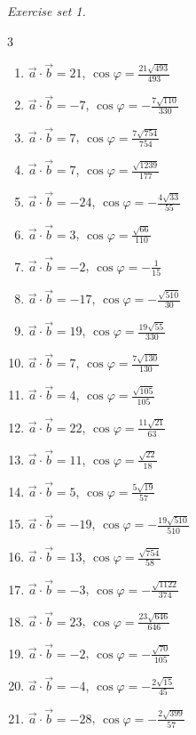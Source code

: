 \par\noindent\emph{Exercise set 1.}\nopagebreak
\begin{multicols}{3}\raggedright
\begin{enumerate}[label=\arabic*., leftmargin=*, itemsep=1pt]
\item $\vec a\cdot\vec b=21$, $\cos\varphi=\frac{21 \sqrt{493}}{493}$
\item $\vec a\cdot\vec b=-7$, $\cos\varphi=- \frac{7 \sqrt{110}}{330}$
\item $\vec a\cdot\vec b=7$, $\cos\varphi=\frac{7 \sqrt{754}}{754}$
\item $\vec a\cdot\vec b=7$, $\cos\varphi=\frac{\sqrt{1239}}{177}$
\item $\vec a\cdot\vec b=-24$, $\cos\varphi=- \frac{4 \sqrt{33}}{55}$
\item $\vec a\cdot\vec b=3$, $\cos\varphi=\frac{\sqrt{66}}{110}$
\item $\vec a\cdot\vec b=-2$, $\cos\varphi=- \frac{1}{15}$
\item $\vec a\cdot\vec b=-17$, $\cos\varphi=- \frac{\sqrt{510}}{30}$
\item $\vec a\cdot\vec b=19$, $\cos\varphi=\frac{19 \sqrt{55}}{330}$
\item $\vec a\cdot\vec b=7$, $\cos\varphi=\frac{7 \sqrt{130}}{130}$
\item $\vec a\cdot\vec b=4$, $\cos\varphi=\frac{\sqrt{105}}{105}$
\item $\vec a\cdot\vec b=22$, $\cos\varphi=\frac{11 \sqrt{21}}{63}$
\item $\vec a\cdot\vec b=11$, $\cos\varphi=\frac{\sqrt{22}}{18}$
\item $\vec a\cdot\vec b=5$, $\cos\varphi=\frac{5 \sqrt{19}}{57}$
\item $\vec a\cdot\vec b=-19$, $\cos\varphi=- \frac{19 \sqrt{510}}{510}$
\item $\vec a\cdot\vec b=13$, $\cos\varphi=\frac{\sqrt{754}}{58}$
\item $\vec a\cdot\vec b=-3$, $\cos\varphi=- \frac{\sqrt{1122}}{374}$
\item $\vec a\cdot\vec b=23$, $\cos\varphi=\frac{23 \sqrt{646}}{646}$
\item $\vec a\cdot\vec b=-2$, $\cos\varphi=- \frac{\sqrt{70}}{105}$
\item $\vec a\cdot\vec b=-4$, $\cos\varphi=- \frac{2 \sqrt{15}}{45}$
\item $\vec a\cdot\vec b=-28$, $\cos\varphi=- \frac{2 \sqrt{399}}{57}$

\end{enumerate}
\end{multicols}
